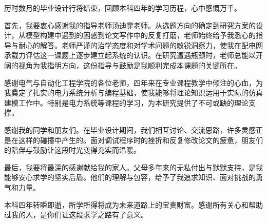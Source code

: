 \documentclass[10pt,a4paper]{article}
\providecommand{\songti}{}
\renewcommand{\songti}{\thesissong}
\numberwithin{equation}{section}
\numberwithin{table}{section}
\numberwithin{figure}{section}
\newcommand{\thesisbodyfont}{\setstretch{1}\songti\fontsize{12pt}{20pt}\selectfont}
\begin{document}
    {\thesisbodyfont
    历时数月的毕业设计行将结束，回顾本科四年的学习历程，心中感慨万千。

    首先，我要衷心感谢我的指导老师汤迪霏老师。从选题方向的确定到研究方案的设计，从模型构建中遇到的困惑到论文写作中的反复打磨，老师始终给予我悉心的指导与耐心的解答。老师严谨的治学态度和对学术问题的敏锐洞察力，使我在配电网承载力评估这一课题上逐步建立起系统的认识。在研究遭遇瓶颈时，老师总能以开阔的视角为我指明方向，这份指导与鼓励是我顺利完成本课题的关键所在。

    感谢电气与自动化工程学院的各位老师，四年来在专业课程教学中倾注的心血，为我奠定了扎实的电力系统分析与编程基础，使我能够将理论知识运用于实际的仿真建模工作中。特别是电力系统等课程的学习，为本研究提供了不可或缺的理论支撑。

    感谢我的同学和朋友们。在毕业设计期间，我们相互讨论、交流思路，许多灵感正是在这样的碰撞中产生的。面对调试程序时的挫折和反复修改论文的疲惫，朋友们的陪伴与鼓励让这段时光变得充实而温暖。

    最后，我要将最深的感谢献给我的家人。父母多年来的无私付出与默默支持，是我能够安心求学的坚实后盾。他们的理解与包容，给予了我追求知识、面对挑战的勇气和力量。

    本科四年转瞬即逝，所学所得将成为未来道路上的宝贵财富。感谢所有关心和帮助过我的人，是你们让这段求学之路有了意义。
    \par}
\end{document}
